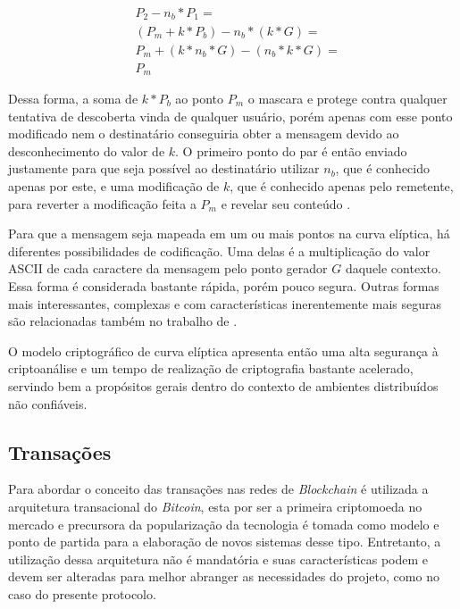 \begin{align*}
    &P_2 - n_b * P_1 = \\
    &(P_m + k * P_b) - n_b * (k * G) = \\
    &P_m + (k * n_b * G) - (n_b * k * G) = \\
    &P_m
\end{align*}

Dessa forma, a soma de $k*P_b$ ao ponto $P_m$ o mascara e protege contra qualquer tentativa de descoberta vinda de qualquer usuário, porém apenas com esse ponto modificado nem o destinatário conseguiria obter a mensagem devido ao desconhecimento do valor de $k$. O primeiro ponto do par é então enviado justamente para que seja possível ao destinatário utilizar $n_b$, que é conhecido apenas por este, e uma modificação de $k$, que é conhecido apenas pelo remetente, para reverter a modificação feita a $P_m$ e revelar seu conteúdo \cite{stallings}.

Para que a mensagem seja mapeada em um ou mais pontos na curva elíptica, há diferentes possibilidades de codificação. Uma delas é a multiplicação do valor ASCII de cada caractere da mensagem pelo ponto gerador $G$ daquele contexto. Essa forma é considerada bastante rápida, porém pouco segura. Outras formas mais interessantes, complexas e com características inerentemente mais seguras são relacionadas também no trabalho de .

O modelo criptográfico de curva elíptica apresenta então uma alta segurança à criptoanálise e um tempo de realização de criptografia bastante acelerado, servindo bem a propósitos gerais dentro do contexto de ambientes distribuídos não confiáveis. 

\subsection{Transações}
\label{subsec:blobkchain:transacaoes}

Para abordar o conceito das transações nas redes de \textit{Blockchain} é utilizada a arquitetura transacional do \textit{Bitcoin}, esta por ser a primeira criptomoeda no mercado e precursora da popularização da tecnologia é tomada como modelo e ponto de partida para a elaboração de novos sistemas desse tipo. Entretanto, a utilização dessa arquitetura não é mandatória e suas características podem e devem ser alteradas para melhor abranger as necessidades do projeto, como no caso do presente protocolo.

